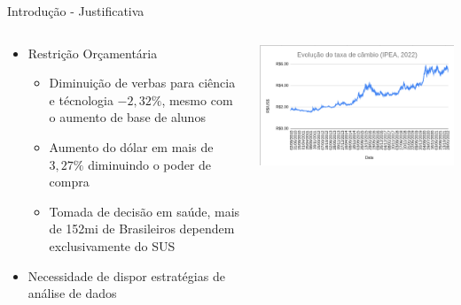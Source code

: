 \documentclass[10pt,brazil]{beamer}
\theoremstyle{definition}
\begin{document}
\begin{frame}{Introdução - Justificativa}
  \begin{columns}
    \begin{column}{0.5\textwidth}
      \begin{itemize}
        \item Restrição Orçamentária
              \begin{itemize}
                \item Diminuição de verbas para ciência e técnologia $-2,32\%$, mesmo com o aumento de base de alunos
                \item Aumento do dólar em mais de $3,27\%$ diminuindo o poder de compra
                \item Tomada de decisão em saúde, mais de 152mi de Brasileiros dependem exclusivamente do SUS %
              \end{itemize}
        \item Necessidade de dispor estratégias de análise de dados
      \end{itemize}
    \end{column}
    \begin{column}{0.5\textwidth}  %
      \begin{center}
        \includegraphics[width=1\textwidth]{variacaodolar.png}
      \end{center}
    \end{column}
  \end{columns}
\end{frame}

\end{document}
